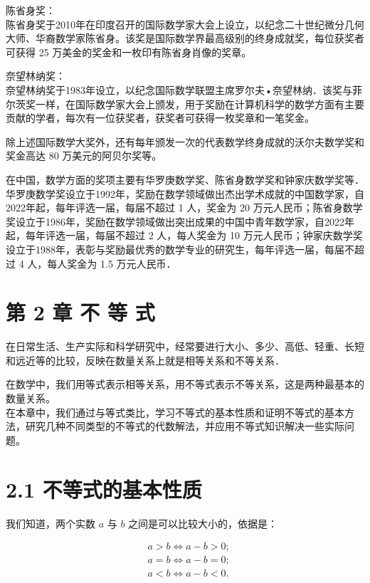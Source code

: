 \documentclass[10pt]{article}
\begin{document}
陈省身奖：\\
陈省身奖于2010年在印度召开的国际数学家大会上设立，以纪念二十世纪微分几何大师、华裔数学家陈省身。该奖是国际数学界最高级别的终身成就奖，每位获奖者可获得 25 万美金的奖金和一枚印有陈省身肖像的奖章。

奈望林纳奖：\\
奈望林纳奖于1983年设立，以纪念国际数学联盟主席罗尔夫•奈望林纳．该奖与菲尔茨奖一样，在国际数学家大会上颁发，用于奖励在计算机科学的数学方面有主要贡献的学者，每次有一位获奖者，获奖者可获得一枚奖章和一笔奖金。

除上述国际数学大奖外，还有每年颁发一次的代表数学终身成就的沃尔夫数学奖和奖金高达 80 万美元的阿贝尔奖等。

在中国，数学方面的奖项主要有华罗庚数学奖、陈省身数学奖和钟家庆数学奖等．华罗庚数学奖设立于1992年，奖励在数学领域做出杰出学术成就的中国数学家，自2022年起，每年评选一届，每届不超过 1 人，奖金为 20 万元人民币；陈省身数学奖设立于1986年，奖励在数学领域做出突出成果的中国中青年数学家，自2022年起，每年评选一届，每届不超过 2 人，每人奖金为 10 万元人民币；钟家庆数学奖设立于1988年，表彰与奖励最优秀的数学专业的研究生，每年评选一届，每届不超过 4 人，每人奖金为 1.5 万元人民币．

\section*{第 2 章 不 等 式}
在日常生活、生产实际和科学研究中，经常要进行大小、多少、高低、轻重、长短和远近等的比较，反映在数量关系上就是相等关系和不等关系．

在数学中，我们用等式表示相等关系，用不等式表示不等关系，这是两种最基本的数量关系。\\
在本章中，我们通过与等式类比，学习不等式的基本性质和证明不等式的基本方法，研究几种不同类型的不等式的代数解法，并应用不等式知识解决一些实际问题。

\section*{2.1 不等式的基本性质}
我们知道，两个实数 \(a\) 与 \(b\) 之间是可以比较大小的，依据是：

\[
\begin{aligned}
& a>b \Leftrightarrow a-b>0 ; \\
& a=b \Leftrightarrow a-b=0 ; \\
& a<b \Leftrightarrow a-b<0 .
\end{aligned}
\]
\end{document}

